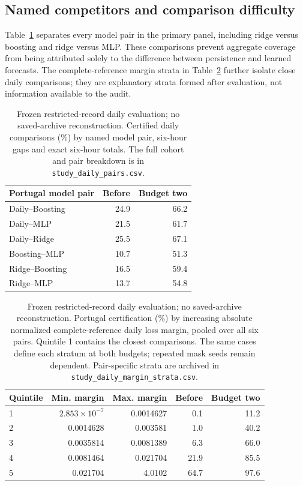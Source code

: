 \documentclass[12pt]{article}
\begin{document}
\subsection{Named competitors and comparison difficulty}\label{app:named-pairs}
Table~\ref{tab:namedpairs} separates every model pair in the primary panel,
including ridge versus boosting and ridge versus MLP. These comparisons
prevent aggregate coverage from being attributed solely to the difference
between persistence and learned forecasts. The complete-reference margin
strata in Table~\ref{tab:marginstrata} further isolate close daily comparisons;
they are explanatory strata formed after evaluation, not information
available to the audit.
\begin{table}[htbp]
\centering\normalsize\setlength{\tabcolsep}{4pt}
\caption{Frozen restricted-record daily evaluation; no saved-archive reconstruction. Certified daily comparisons (\%) by named model pair, six-hour gaps and exact six-hour totals. The full cohort and pair breakdown is in \texttt{study\_daily\_pairs.csv}.}
\label{tab:namedpairs}
\begin{tabular}{lrr}
\toprule
Portugal model pair & Before & Budget two\\
\midrule
Daily--Boosting & 24.9 & 66.2\\
Daily--MLP & 21.5 & 61.7\\
Daily--Ridge & 25.5 & 67.1\\
Boosting--MLP & 10.7 & 51.3\\
Ridge--Boosting & 16.5 & 59.4\\
Ridge--MLP & 13.7 & 54.8\\
\bottomrule
\end{tabular}
\end{table}
\begin{table}[htbp]
\centering\normalsize\setlength{\tabcolsep}{4pt}
\caption{Frozen restricted-record daily evaluation; no saved-archive reconstruction. Portugal certification (\%) by increasing absolute normalized complete-reference daily loss margin, pooled over all six pairs. Quintile 1 contains the closest comparisons. The same cases define each stratum at both budgets; repeated mask seeds remain dependent. Pair-specific strata are archived in \texttt{study\_daily\_margin\_strata.csv}.}
\label{tab:marginstrata}
\begin{tabular}{lrrrr}
\toprule
Quintile & Min. margin & Max. margin & Before & Budget two\\
\midrule
1 & $2.853\times10^{-7}$ & 0.0014627 & 0.1 & 11.2\\
2 & 0.0014628 & 0.003581 & 1.0 & 40.2\\
3 & 0.0035814 & 0.0081389 & 6.3 & 66.0\\
4 & 0.0081464 & 0.021704 & 21.9 & 85.5\\
5 & 0.021704 & 4.0102 & 64.7 & 97.6\\
\bottomrule
\end{tabular}
\end{table}
\end{document}
